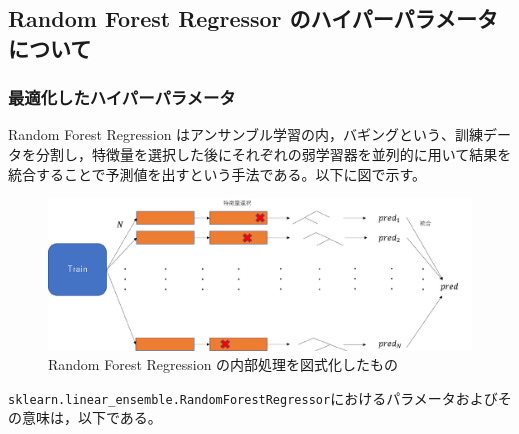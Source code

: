 \documentclass[a4j,11pt]{jarticle}
\begin{document}
\subsection{Random Forest Regressor のハイパーパラメータについて}
\subsubsection{最適化したハイパーパラメータ}

 Random Forest Regression はアンサンブル学習の内，バギングという、訓練データを分割し，特徴量を選択した後にそれぞれの弱学習器を並列的に用いて結果を統合することで予測値を出すという手法である。\cite{RF}以下に図で示す。

\begin{figure}[H]
\centering
\includegraphics[scale=0.5]{./images/RFR.pdf}
\caption{ Random Forest Regression の内部処理を図式化したもの}
\label{fig:ex1_I_1}
\end{figure}

\texttt{sklearn.linear\_ensemble.RandomForestRegressor}におけるパラメータおよびその意味は，以下である。~\cite{sklearn_RFR}
\end{document}
